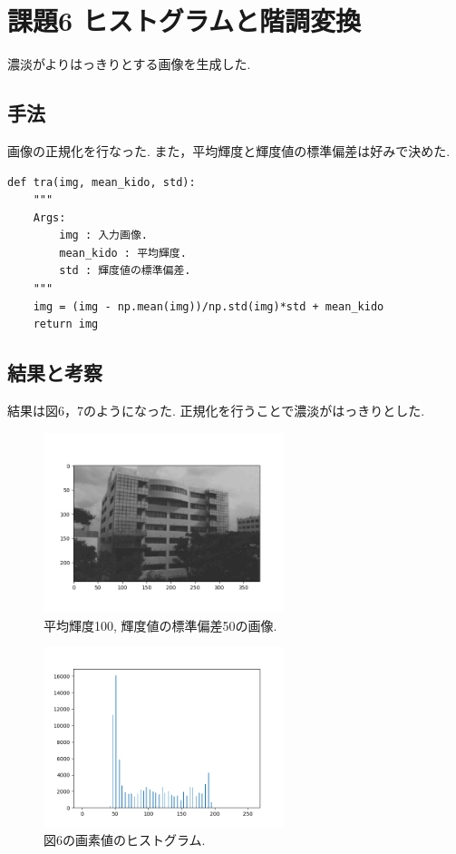 \documentclass[twocolumn, 10pt,a4j]{jsarticle}
\begin{document}
\section{課題6 ヒストグラムと階調変換}
濃淡がよりはっきりとする画像を生成した.

    \subsection{手法}
    画像の正規化を行なった. また，平均輝度と輝度値の標準偏差は好みで決めた.

\begin{lstlisting}[caption=kadai5.py, label=p4_txt]
def tra(img, mean_kido, std):
    """
    Args:
        img : 入力画像.
        mean_kido : 平均輝度.
        std : 輝度値の標準偏差.
    """
    img = (img - np.mean(img))/np.std(img)*std + mean_kido
    return img
\end{lstlisting}


    \subsection{結果と考察}
    結果は図6，7のようになった. 正規化を行うことで濃淡がはっきりとした.
    \begin{figure}[H]
        \begin{center}
            \includegraphics[width=7cm]{../img/result_fig.png}
            \caption{平均輝度100, 輝度値の標準偏差50の画像.}
        \end{center}
        \end{figure}

        \begin{figure}[H]
            \begin{center}
                \includegraphics[width=7cm]{../img/result_hist.png}
                \caption{図6の画素値のヒストグラム.}
            \end{center}
            \end{figure}
\end{document}
